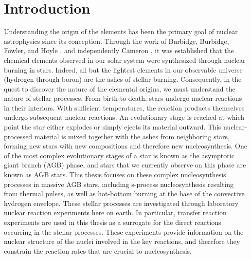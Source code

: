 \chapter{\textbf{Introduction}}
\label{ch:intro}

Understanding the origin of the elements has been the primary goal of nuclear astrophysics since its conception. Through the work of Burbidge, Burbidge, Fowler, and Hoyle \cite{Burbidge1957}, and independently Cameron \cite{Cameron1957}, it was established that the chemical elements observed in our solar system were synthesized through nuclear burning in stars. Indeed, all but the lightest elements in our observable universe (hydrogen through boron) are the ashes of stellar burning. Consequently, in the quest to discover the nature of the elemental origins, we must understand the nature of stellar processes. From birth to death, stars undergo nuclear reactions in their interiors. With sufficient temperatures, the reaction products themselves undergo subsequent nuclear reactions. An evolutionary stage is reached at which point the star either explodes or simply ejects its material outward. This nuclear-processed material is mixed together with the ashes from neighboring stars, forming new stars with new compositions and therefore new nucleosynthesis. One of the most complex evolutionary stages of a star is known as the asymptotic giant branch (AGB) phase, and stars that we currently observe on this phase are known as AGB stars. This thesis focuses on these complex nucleosynthesis processes in massive AGB stars, including s-process nucleosynthesis resulting from thermal pulses, as well as hot-bottom burning at the base of the convective hydrogen envelope. These stellar processes are investigated through laboratory nuclear reaction experiments here on earth. In particular, transfer reaction experiments are used in this thesis as a surrogate for the direct reactions occurring in the stellar processes. These experiments provide information on the nuclear structure of the nuclei involved in the key reactions, and therefore they constrain the reaction rates that are crucial to nucleosynthesis.

